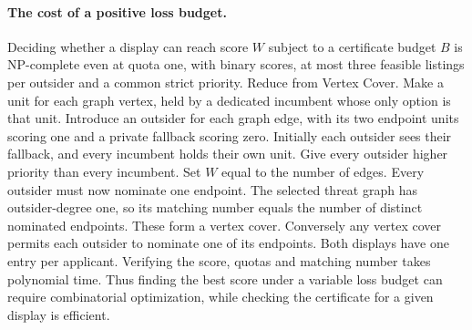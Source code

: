 \paragraph{The cost of a positive loss budget.}
Deciding whether a display can reach score $W$ subject to a certificate budget
$B$ is NP-complete even at quota one, with binary scores, at most three feasible
listings per outsider and a common strict priority. Reduce from Vertex Cover.
Make a unit for each graph vertex, held by a dedicated incumbent whose only
option is that unit. Introduce an outsider for each graph edge, with its two
endpoint units scoring one and a private fallback scoring zero. Initially each
outsider sees their fallback, and every incumbent holds their own unit. Give
every outsider higher priority than every incumbent. Set $W$ equal to the
number of edges. Every outsider must now nominate one endpoint. The selected
threat graph has outsider-degree one, so its matching number equals the number
of distinct nominated endpoints. These form a vertex cover. Conversely any
vertex cover permits each outsider to nominate one of its endpoints. Both
displays have one entry per applicant. Verifying the score, quotas and
matching number takes polynomial time. Thus finding the best score under
a variable loss budget can require combinatorial optimization, while checking
the certificate for a given display is efficient.
